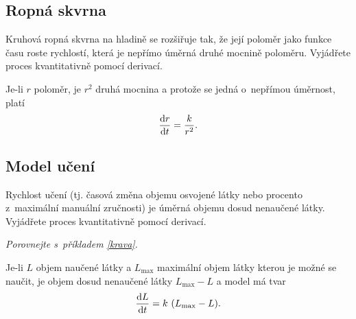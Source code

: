 
\subsection{Ropná skvrna} Kruhová ropná skvrna na hladině se rozšiřuje
tak, že její poloměr jako funkce času roste rychlostí, která je
nepřímo úměrná druhé mocnině poloměru. Vyjádřete proces kvantitativně
pomocí derivací.

\reseni
Je-li $r$ poloměr, je $r^2$ druhá mocnina a protože se jedná o nepřímou úměrnost, platí
$$\frac{\mathrm{d}r}{\mathrm{d}t}=\frac{k}{r^2}.$$
\konec

\subsection{Model učení} Rychlost učení (tj. časová změna objemu
osvojené látky nebo procento z~maximální manuální zručnosti) je úměrná
objemu dosud nenaučené látky. Vyjádřete proces kvantitativně pomocí
derivací.

\textit{Porovnejte s příkladem \ref{krava}.}

\reseni
Je-li $L$ objem naučené látky a $L_{\max}$ maximální objem látky kterou je možné se naučit, je objem dosud nenaučené látky $L_{\max}-L$ a model má tvar
$$\derivace Lt=k (L_{\max}-L).$$
\konec





\stranka


\def\der #1#2.#3.{$#1(#2)=#3$}
